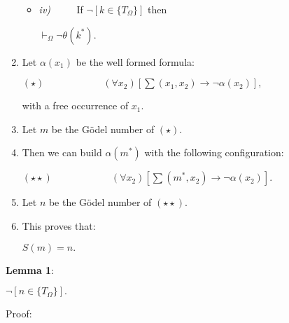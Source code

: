 \documentclass[12pt]{article}
\begin{document}
\begin{enumerate}
\begin{itemize}
\item \emph{iv)} $\hspace{2em}$ If $\neg [k \in \{ T_{\Omega} \}]$ then

\begin{center}
$\vdash_{\Omega} \neg \theta (k^*).$
\end{center}
\end{itemize}

\item Let $\alpha (x_1)$ be the well formed formula:

\begin{center}
$(\star) \hspace{6em} (\forall x_2) [\sum (x_1, x_2) \to \neg \alpha (x_2)],$
\end{center}

with a free occurrence of $x_1.$

\item Let $m$ be the G\"{o}del number of $(\star).$

\item Then we can build $\alpha (m^*)$ with the following configuration:

\begin{center}
$(\star \star) \hspace{6em} (\forall x_2) [\sum (m^*, x_2) \to \neg \alpha (x_2)].$
\end{center}

\item Let $n$ be the G\"odel number of $(\star \star).$

\item This proves that:

\begin{center}
$S (m) = n.$
\end{center}

\end{enumerate}

\textbf{Lemma 1}:

\begin{center}
$\neg [n \in \{ T_{\Omega} \}].$ 
\end{center}

Proof:
\end{document}
